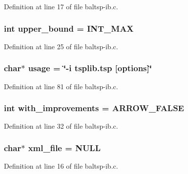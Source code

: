 Definition at line 17 of file baltsp-ib.c.\hypertarget{bin_2baltsp-ib_8c_f5a34eb1d01ffd792adcadc9627ffcb8}{
\subsubsection[{upper\_\-bound}]{\setlength{\rightskip}{0pt plus 5cm}int {\bf upper\_\-bound} = INT\_\-MAX}}
\label{bin_2baltsp-ib_8c_f5a34eb1d01ffd792adcadc9627ffcb8}




Definition at line 25 of file baltsp-ib.c.\hypertarget{bin_2baltsp-ib_8c_adebe2487a2c5240ab6cd02c83add0bf}{
\subsubsection[{usage}]{\setlength{\rightskip}{0pt plus 5cm}char$\ast$ {\bf usage} = \char`\"{}-i tsplib.tsp \mbox{[}{\bf options}\mbox{]}\char`\"{}}}
\label{bin_2baltsp-ib_8c_adebe2487a2c5240ab6cd02c83add0bf}




Definition at line 81 of file baltsp-ib.c.\hypertarget{bin_2baltsp-ib_8c_91079460b00ac08193d5ee47094f8f70}{
\subsubsection[{with\_\-improvements}]{\setlength{\rightskip}{0pt plus 5cm}int {\bf with\_\-improvements} = ARROW\_\-FALSE}}
\label{bin_2baltsp-ib_8c_91079460b00ac08193d5ee47094f8f70}




Definition at line 32 of file baltsp-ib.c.\hypertarget{bin_2baltsp-ib_8c_bf4e392494984c6ef8259268eb1fe421}{
\subsubsection[{xml\_\-file}]{\setlength{\rightskip}{0pt plus 5cm}char$\ast$ {\bf xml\_\-file} = NULL}}
\label{bin_2baltsp-ib_8c_bf4e392494984c6ef8259268eb1fe421}




Definition at line 16 of file baltsp-ib.c.